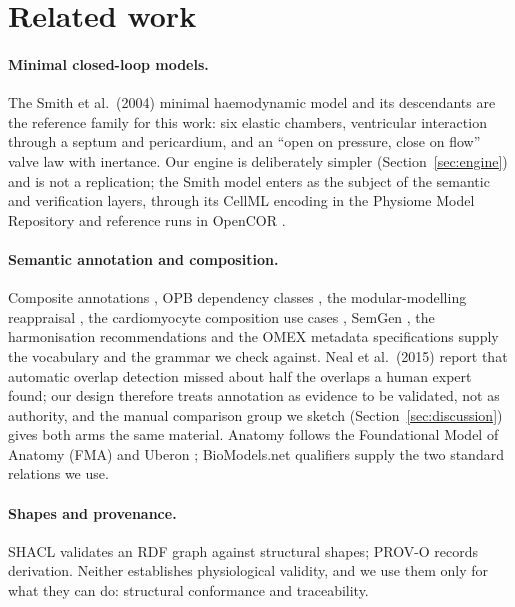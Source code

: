 \documentclass[11pt,letterpaper]{article}
\begin{document}
\section{Related work}
\label{sec:related}

\paragraph{Minimal closed-loop models.} The Smith et al.\ (2004) minimal haemodynamic model \citep{smith2004minimal} and its descendants \citep{paeme2011mitral,revie2013porcine,pironet2013multiscale} are the reference family for this work: six elastic chambers, ventricular interaction through a septum and pericardium, and an ``open on pressure, close on flow'' valve law with inertance. Our engine is deliberately simpler (Section~\ref{sec:engine}) and is not a replication; the Smith model enters as the subject of the semantic and verification layers, through its CellML encoding in the Physiome Model Repository \citep{lloyd2008pmr,cuellar2003cellml} and reference runs in OpenCOR \citep{garny2015opencor}.

\paragraph{Semantic annotation and composition.} Composite annotations \citep{gennari2011composite}, OPB dependency classes \citep{cook2013opb}, the modular-modelling reappraisal \citep{neal2014reappraisal}, the cardiomyocyte composition use cases \citep{neal2015cardiomyocyte}, SemGen \citep{neal2019semgen}, the harmonisation recommendations \citep{neal2019harmonizing} and the OMEX metadata specifications \citep{neal2020omex,gennari2021omex} supply the vocabulary and the grammar we check against. Neal et al.\ (2015) report that automatic overlap detection missed about half the overlaps a human expert found; our design therefore treats annotation as evidence to be validated, not as authority, and the manual comparison group we sketch (Section~\ref{sec:discussion}) gives both arms the same material. Anatomy follows the Foundational Model of Anatomy (FMA) \citep{rosse2003fma} and Uberon \citep{mungall2012uberon}; BioModels.net qualifiers \citep{courtot2011qualifiers} supply the two standard relations we use.

\paragraph{Shapes and provenance.} SHACL \citep{shacl2017} validates an RDF graph against structural shapes; PROV-O \citep{provo2013} records derivation. Neither establishes physiological validity, and we use them only for what they can do: structural conformance and traceability.
\end{document}
